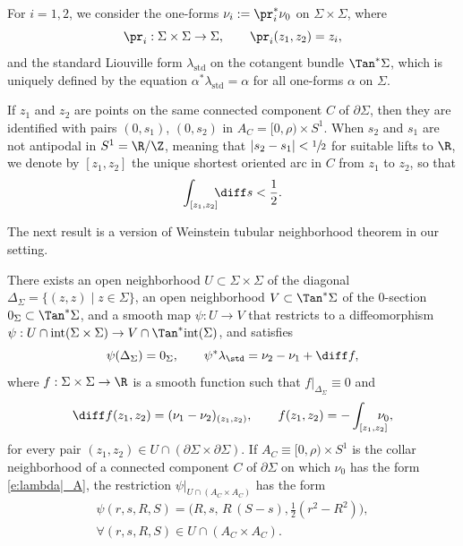 For $i=1,2$, we consider the one-forms $\nu_i:=\pr_i^*\nu_0$ on $\Sigma\times\Sigma$, where
\[
\pr_i:\Sigma\times\Sigma\to\Sigma, \qquad \pr_i(z_1,z_2)=z_i,
\]
and the standard Liouville form $\lambda_{\mathrm{std}}$ on the cotangent bundle $\Tan^*\Sigma$, which is uniquely defined by the equation $\alpha^*\lambda_{\mathrm{std}}=\alpha$ for all one-forms $\alpha$ on $\Sigma$.

If $z_1$ and $z_2$ are points on the same connected component $C$ of $\partial \Sigma$, then they are identified with pairs $(0,s_1)$, $(0,s_2)$ in $A_C=[0,\rho)\times S^1$. When $s_2$ and $s_1$ are not antipodal in $S^1=\R/\Z$, meaning that $|s_2-s_1|< \sfrac 12$ for suitable lifts to $\R$, we denote by $[z_1,z_2]$ the unique shortest oriented arc in $C$ from $z_1$ to $z_2$, so that
\[
\int_{[z_1,z_2]} \!\!\! \diff s < \frac12.
\]

The next result is a version of Weinstein tubular neighborhood theorem in our setting.

\begin{lem}
\label{l:Weinstein}
There exists an open neighborhood $U\subset\Sigma\times\Sigma$ of the diagonal $\Delta_\Sigma=\{(z,z)\mid z\in\Sigma\}$, an open neighborhood \hbox{$V\subset\Tan^*\Sigma$} of the $0$-section $0_\Sigma\subset\Tan^*\Sigma$, and a smooth map $\psi:U\to V$ that restricts to a diffeomorphism $\psi:U\cap\mathrm{int}(\Sigma\times\Sigma)\to V\cap \Tan^* \mathrm{int} (\Sigma)$, and satisfies
\[
\psi(\Delta_\Sigma)=0_\Sigma,
\qquad
\psi^*\lambda_{\std}=\nu_2-\nu_1 + \diff f,
\] where $f:\Sigma\times\Sigma\to\R$ is a smooth function such that $f|_{\Delta_\Sigma}\equiv0$ and
\[
\diff f(z_1,z_2)=(\nu_1-\nu_2)_{(z_1,z_2)},
\qquad
f(z_1,z_2)=-\int_{[z_1,z_2]} \!\!\!\!\!\!\nu_0,
\]
for every pair $(z_1,z_2)\in U\cap(\partial\Sigma\times\partial\Sigma)$.
If $A_C\equiv[0,\rho)\times S^1$ is the collar neighborhood of a connected component $C$ of $\partial\Sigma$ on which $\nu_0$ has the form \eqref{e:lambda|_A}, the restriction $\psi|_{U\cap(A_C\times A_C)}$ has the form
\begin{equation}
\label{psi}
\begin{split}
\psi(r,s,R,S)=\big( R,s,\,R\,(S-s),\tfrac 1 2 (r^2-R^2) \big),
\\
\forall (r,s,R,S)\in U\cap(A_C\times A_C).
\end{split}
\end{equation}
\end{lem}

